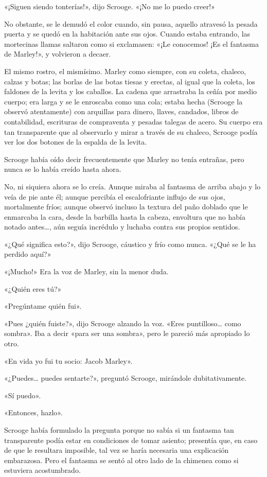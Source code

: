 \documentclass{novela}
\begin{document}
 «¡Siguen siendo tonterías!», dijo Scrooge. «¡No me lo puedo creer!»

 No obstante, se le demudó el color cuando, sin pausa, aquello atravesó la pesada puerta y se quedó en la habitación ante sus ojos. Cuando estaba entrando, las mortecinas llamas saltaron como si exclamasen: «¡Le conocemos! ¡Es el fantasma de Marley!», y volvieron a decaer.

 El mismo rostro, el mismísimo. Marley como siempre, con su coleta, chaleco, calzas y botas; las borlas de las botas tiesas y erectas, al igual que la coleta, los faldones de la levita y los caballos. La cadena que arrastraba la ceñía por medio cuerpo; era larga y se le enroscaba como una cola; estaba hecha (Scrooge la observó atentamente) con arquillas para dinero, llaves, candados, libros de contabilidad, escrituras de compraventa y pesadas talegas de acero. Su cuerpo era tan transparente que al observarlo y mirar a través de su chaleco, Scrooge podía ver los dos botones de la espalda de la levita.

 Scrooge había oído decir frecuentemente que Marley no tenía entrañas, pero nunca se lo había creído hasta ahora.

 No, ni siquiera ahora se lo creía. Aunque miraba al fantasma de arriba abajo y lo veía de pie ante él; aunque percibía el escalofriante influjo de sus ojos, mortalmente fríos; aunque observó incluso la textura del paño doblado que le enmarcaba la cara, desde la barbilla hasta la cabeza, envoltura que no había notado antes{\ldots}, aún seguía incrédulo y luchaba contra sus propios sentidos.

 «¿Qué significa esto?», dijo Scrooge, cáustico y frío como nunca. «¿Qué se le ha perdido aquí?»

 «¡Mucho!» Era la voz de Marley, sin la menor duda.

 «¿Quién eres tú?»

 «Pregúntame quién fui».

 «Pues ¿quién fuiste?», dijo Scrooge alzando la voz. «Eres puntilloso{\ldots} como sombra». Iba a decir «para ser una sombra», pero le pareció más apropiado lo otro.

 «En vida yo fui tu socio: Jacob Marley».

 «¿Puedes{\ldots} puedes sentarte?», preguntó Scrooge, mirándole dubitativamente.

 «Sí puedo».

 «Entonces, hazlo».

 Scrooge había formulado la pregunta porque no sabía si un fantasma tan transparente podía estar en condiciones de tomar asiento; presentía que, en caso de que le resultara imposible, tal vez se haría necesaria una explicación embarazosa. Pero el fantasma se sentó al otro lado de la chimenea como si estuviera acostumbrado.
\end{document}
